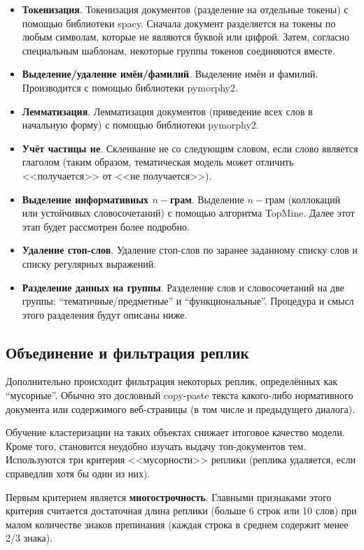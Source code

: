 \begin{itemize}
\item \textbf{Токенизация}. Токенизация документов (разделение на отдельные токены) с помощью библиотеки spacy. Сначала документ разделяется на токены по любым символам, которые не являются буквой или цифрой. Затем, согласно специальным шаблонам, некоторые группы токенов соединяются вместе.
\item \textbf{Выделение/удаление имён/фамилий}. Выделение имён и фамилий. Производится с помощью библиотеки pymorphy2.
\item \textbf{Лемматизация}. Лемматизация документов (приведение всех слов в начальную форму) с помощью библиотеки pymorphy2.
\item \textbf{Учёт частицы не}. Склеивание не со следующим словом, если слово является глаголом (таким образом, тематическая модель может отличить <<получается>> от <<не получается>>).
\item \textbf{Выделение информативных $n-$грам}. Выделение $n-$грам (коллокаций или устойчивых словосочетаний) с помощью алгоритма TopMine. Далее этот этап будет рассмотрен более подробно.
\item \textbf{Удаление стоп-слов}. Удаление стоп-слов по заранее заданному списку слов и списку регулярных выражений.
\item \textbf{Разделение данных на группы}. Разделение слов и словосочетаний на две группы: “тематичные/предметные” и “функциональные”. Процедура и смысл этого разделения будут описаны ниже.
\end{itemize}

\subsection{Объединение и фильтрация реплик}

Дополнительно происходит фильтрация некоторых реплик, определённых как “мусорные”. Обычно это дословный copy-paste текста какого-либо нормативного документа или содержимого веб-страницы (в том числе и предыдущего диалога).

Обучение кластеризации на таких объектах снижает итоговое качество модели. Кроме того, становится неудобно изучать выдачу топ-документов тем. Используются три критерия <<мусорности>> реплики (реплика удаляется, если справедлив хотя бы один из них).

Первым критерием является \textbf{многострочность}. Главными признаками этого критерия считается достаточная длина реплики (больше 6 строк или 10 слов) при малом количестве знаков препинания (каждая строка в среднем содержит менее 2/3 знака).

